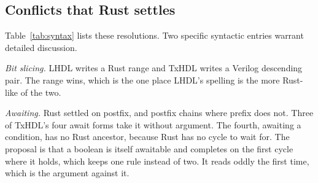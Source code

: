 \subsection{Conflicts that Rust settles}

Table~\ref{tab:syntax} lists these resolutions. Two specific syntactic entries
warrant detailed discussion.

\emph{Bit slicing.} LHDL writes a Rust range and TxHDL writes a Verilog
descending pair. The range wins, which is the one place LHDL's spelling is
the more Rust-like of the two.

\emph{Awaiting.} Rust settled on postfix, and postfix chains where prefix
does not. Three of TxHDL's four await forms take it without argument. The
fourth, awaiting a condition, has no Rust ancestor, because Rust has no
cycle to wait for. The proposal is that a boolean is itself awaitable and
completes on the first cycle where it holds, which keeps one rule instead of
two. It reads oddly the first time, which is the argument against it.

